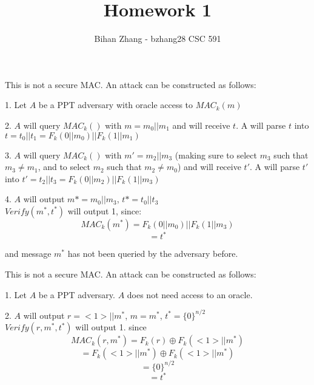 \documentclass[12pt]{article}
\newenvironment{question}[2][Question]{\begin{trivlist}
		\item[\hskip \labelsep {\bfseries #1}\hskip \labelsep {\bfseries #2.}]}{\end{trivlist}}
\begin{document}
	
	

	\title{Homework 1}%
	\author{Bihan Zhang - bzhang28 %
		CSC 591} %
	
	\maketitle
	
	
	\begin{question}{1} 
		This is not a secure MAC. An attack can be constructed as follows:
		
		
		1. Let $A$ be a PPT adversary with oracle access to $MAC_k(m)$
		
		2. $A$ will query $MAC_k()$ with $m=m_0||m_1$ and will receive $t$. A will parse $t$ into $t=t_0||t_1=F_k(0||m_0)||F_k(1||m_1)$ 
		
		3. $A$ will query $MAC_k()$ with $m'=m_2||m_3$ (making sure to select $m_3$ such that $m_3 \neq m_1$, and to select $m_2$ such that $m_2\neq m_0$) and will receive $t'$. A will parse $t'$ into $t'=t_2||t_3=F_k(0||m_2)||F_k(1||m_3)$
		
		4. $A$ will output $m*=m_0||m_3$, $t*=t_0||t_3$\\
		
		$Verify(m^*, t^*)$ will output 1, since:
		$$MAC_k(m^*)=F_k(0||m_0)||F_k(1||m_3)$$ 
		$$=t^*$$
		
		 and message $m^*$ has not been queried by the adversary before. 
		
	\end{question}
	\begin{question}{2}
		This is not a secure MAC. An attack can be constructed as follows:
		
		1. Let $A$ be a PPT adversary. $A$ does not need access to an oracle. 
		
		2. $A$ will output $r=<1>||m^*$, $m=m^*$, $t^*=\{0\}^{n/2}$\\
		
		$Verify(r, m^*, t^*)$ will output 1. since $$MAC_k(r, m^*)= F_k(r)\oplus F_k(<1>||m^*)$$ $$=F_k(<1>||m^*)\oplus F_k(<1>||m^*)$$ $$=\{0\}^{n/2}$$$$=t^*$$
			
			
	\end{question}
\end{document}
